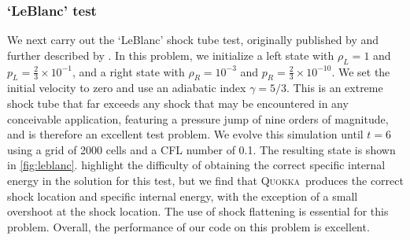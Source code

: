\documentclass[fleqn,usenatbib]{mnras}
\newcommand{\quokka}{\textsc{Quokka}}
\begin{document}
\subsubsection{`LeBlanc' test}
We next carry out the `LeBlanc' shock tube test, originally published by \cite{Benson_1992} and further described by \cite{Pember_2001}. In this problem, we initialize a left state with $\rho_L = 1$ and $p_L = \frac{2}{3} \times 10^{-1}$, and a right state with $\rho_R = 10^{-3}$ and $p_R = \frac{2}{3} \times 10^{-10}$. We set the initial velocity to zero and use an adiabatic index $\gamma = 5/3$. This is an extreme shock tube that far exceeds any shock that may be encountered in any conceivable application, featuring a pressure jump of nine orders of magnitude, and is therefore an excellent test problem.  We evolve this simulation until $t = 6$ using a grid of 2000 cells and a CFL number of 0.1. The resulting state is shown in \autoref{fig:leblanc}. \cite{Pember_2001} highlight the difficulty of obtaining the correct specific internal energy in the solution for this test, but we find that \quokka~produces the correct shock location and specific internal energy, with the exception of a small overshoot at the shock location. The use of shock flattening is essential for this problem. Overall, the performance of our code on this problem is excellent.
\end{document}
